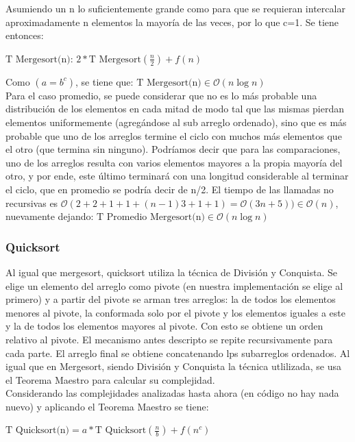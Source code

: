 \documentclass[article,a4paper]{article}
\begin{document}
Asumiendo un n lo suficientemente grande como para que se requieran intercalar aproximadamente n elementos la mayoría de las veces, por lo que c=1. Se tiene entonces:

$\mbox{T Mergesort(n): } 2 * \mbox{T Mergesort} (\frac{n}{2}) + f(n)$

Como $(a = b^c)$, se tiene que: $\mbox{T Mergesort(n)} \in \mathcal O(n \log n)$\\

Para el caso promedio, se puede considerar que no es lo más probable una distribución de los elementos en cada mitad de modo tal que las mismas pierdan elementos uniformemente (agregándose al sub arreglo ordenado), sino que es más probable que uno de los arreglos termine el ciclo con muchos más elementos que el otro (que termina sin ninguno). Podríamos decir que para las comparaciones, uno de los arreglos resulta con varios elementos mayores a la propia mayoría del otro, y por ende, este último terminará con una longitud considerable al terminar el ciclo, que en promedio se podría decir de n/2. El tiempo de las llamadas no recursivas es $\mathcal O(2 + 2 + 1 + 1 + (n-1) 3 + 1 + 1) = \mathcal O(3n + 5)) \in \mathcal O(n)$, nuevamente dejando: $\mbox{T Promedio Mergesort(n)} \in \mathcal O(n \log n)$ 

\subsubsection{Quicksort}

Al igual que mergesort, quicksort utiliza la técnica de División y Conquista. Se elige un elemento del arreglo como pivote (en nuestra implementación se elige al primero) y a partir del pivote se arman tres arreglos: la de todos los elementos menores al pivote, la conformada solo por el pivote y los elementos iguales a este y la de todos los elementos mayores al pivote. Con esto se obtiene un orden relativo al pivote. El mecanismo antes descripto se repite recursivamente para cada parte. El arreglo final se obtiene concatenando lps subarreglos ordenados. Al igual que en Mergesort, siendo División y Conquista la técnica utlilizada, se usa el Teorema Maestro para calcular su complejidad.\\

Considerando las complejidades analizadas hasta ahora (en código no hay nada nuevo) y aplicando el Teorema Maestro se tiene:

$\mbox{T Quicksort(n)} = a * \mbox{T Quicksort}(\frac{n}{b}) + f(n^c)$
\end{document}
